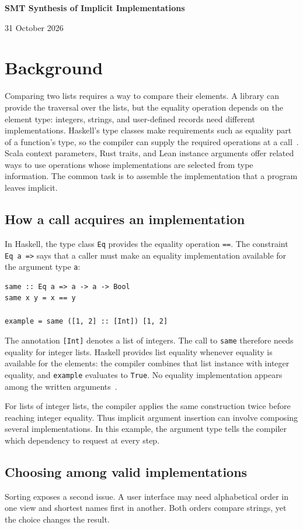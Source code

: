 \documentclass[10pt,a4paper]{article}
\begin{document}
\thispagestyle{plain}
{\Large\bfseries\color{ink} SMT Synthesis of Implicit Implementations}\par
{\small\hfill 31 October 2026}

\section{Background}
\label{sec:background}
Comparing two lists requires a way to compare their elements. A library can provide
the traversal over the lists, but the equality operation depends on the element
type: integers, strings, and user-defined records need different implementations.
Haskell's type classes make requirements such as equality part of a function's
type, so the compiler can supply the required operations at a call~\cite{wadler-blott,haskell-classes}.
Scala context parameters, Rust traits, and Lean instance arguments offer related
ways to use operations whose implementations are selected from type information.
The common task is to assemble the implementation that a program leaves implicit.

\subsection{How a call acquires an implementation}
In Haskell, the type class \texttt{Eq} provides the equality operation
\texttt{==}. The constraint \texttt{Eq a =>} says that a caller must make an
equality implementation available for the argument type \texttt{a}:
\begin{lstlisting}
same :: Eq a => a -> a -> Bool
same x y = x == y

example = same ([1, 2] :: [Int]) [1, 2]
\end{lstlisting}
The annotation \texttt{[Int]} denotes a list of integers. The call to \texttt{same}
therefore needs equality for integer lists. Haskell provides list equality whenever
equality is available for the elements: the compiler combines that list instance
with integer equality, and \texttt{example} evaluates to \texttt{True}.
No equality implementation appears among the written arguments~\cite{haskell-classes}.

For lists of integer lists, the compiler applies the same construction twice before
reaching integer equality. Thus implicit argument insertion can involve composing
several implementations. In this example, the argument type tells the compiler
which dependency to request at every step.

\subsection{Choosing among valid implementations}
Sorting exposes a second issue. A user interface may need alphabetical order in
one view and shortest names first in another. Both orders compare strings, yet
the choice changes the result.
\end{document}
